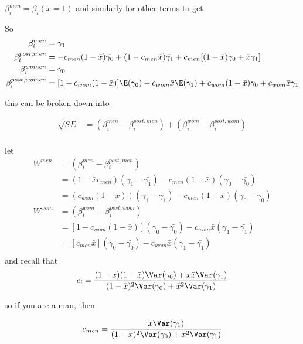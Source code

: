 $\beta_{i}^{men} = \beta_i (x=1)$ and similarly for other terms to get

So 
\begin{align*}
	\beta_i^{men} &= \gamma_1 \\
	\beta_i^{post,men} &= -c_{men} ( 1- \bar{x}) \bar{\gamma_0} + (1 - c_{men}\bar{x}) \bar{\gamma_1} + c_{men} [ (1-\bar{x}) \gamma_0 + \bar{x}\gamma_1] \\
	\beta_i^{women} &= \gamma_0 \\
	\beta_i^{post,women} &= [ 1 - c_{wom}(1-\bar{x}) ]\E(\gamma_0) - c_{wom} \bar{x} \E(\gamma_1) + c_{wom} (1- \bar{x}) \gamma_0 + c_{wom} \bar{x} \gamma_1 \\
\end{align*} 

this can be broken down into

\begin{align*}
	\sqrt{ SE } &= (\beta_i^{men} - \beta_i^{post, men} )+ (\beta_i^{wom} - \beta_i^{post, wom}) \\
\end{align*} 

let 
 \begin{align*}
	 W^{men} &=  (\beta_i^{men} - \beta_i^{post, men}) \\
			&= (1 - \bar{x} c_{men}) (\gamma_1 - \bar{\gamma_1}) - c_{men} ( 1 - \bar{x}) (\gamma_0 - \bar{\gamma_0}) \\
			&= (c_{wom} (1 - \bar{x})) (\gamma_1 - \bar{\gamma_1}) - c_{men} ( 1 - \bar{x}) (\gamma_0 - \bar{\gamma_0}) \\
	 W^{wom} &=  (\beta_i^{wom} - \beta_i^{post, wom}) \\
			 &= [ 1 - c_{wom}(1 - \bar{x}) ] (\gamma_0 - \bar{\gamma_0}) - c_{wom} \bar{x} (\gamma_1 - \bar{\gamma_1}) \\
			 &= [ c_{men} \bar{x}] (\gamma_0 - \bar{\gamma_0}) - c_{wom} \bar{x} (\gamma_1 - \bar{\gamma_1}) \\
\end{align*} 
and recall that
\begin{align*}
	c_{i} &= \frac{(1-x)(1-\bar{x})\Var(\gamma_0) + x\bar{x}\Var(\gamma_1)}{(1-\bar{x})^2\Var(\gamma_0) + \bar{x}^2\Var(\gamma_1)} \\
\end{align*}

so if you are a man, then 

\begin{align*}
	c_{men} =  \frac{\bar{x}\Var(\gamma_1)}{(1-\bar{x})^2\Var(\gamma_0) + \bar{x}^2\Var(\gamma_1)}
\end{align*}

